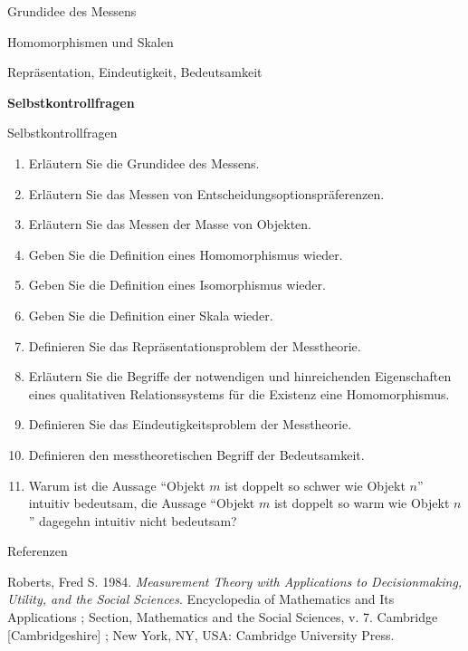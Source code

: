 \documentclass[
  8pt,
  ignorenonframetext,
]{beamer}
\providecommand{\tightlist}{%
  \setlength{\itemsep}{0pt}\setlength{\parskip}{0pt}}
\newlength{\cslhangindent}
\newlength{\cslentryspacingunit} %
\newenvironment{CSLReferences}[2] %
 {%
  \setlength{\parindent}{0pt}
  \ifodd #1
  \let\oldpar\par
  \def\par{\hangindent=\cslhangindent\oldpar}
  \fi
  \setlength{\parskip}{#2\cslentryspacingunit}
 }%
 {}
\begin{document}
\begin{frame}{}
\protect\hypertarget{section-7}{}
\vfill
\Large
{}

Grundidee des Messens

Homomorphismen und Skalen

Repräsentation, Eindeutigkeit, Bedeutsamkeit

\textbf{Selbstkontrollfragen} \vfill
\end{frame}

\begin{frame}{Selbstkontrollfragen}
\protect\hypertarget{selbstkontrollfragen}{}
\footnotesize
{}

\begin{enumerate}
\tightlist
\item
  Erläutern Sie die Grundidee des Messens.
\item
  Erläutern Sie das Messen von Entscheidungsoptionspräferenzen.
\item
  Erläutern Sie das Messen der Masse von Objekten.
\item
  Geben Sie die Definition eines Homomorphismus wieder.
\item
  Geben Sie die Definition eines Isomorphismus wieder.
\item
  Geben Sie die Definition einer Skala wieder.
\item
  Definieren Sie das Repräsentationsproblem der Messtheorie.
\item
  Erläutern Sie die Begriffe der notwendigen und hinreichenden
  Eigenschaften eines qualitativen Relationssystems für die Existenz
  eine Homomorphismus.
\item
  Definieren Sie das Eindeutigkeitsproblem der Messtheorie.
\item
  Definieren den messtheoretischen Begriff der Bedeutsamkeit.
\item
  Warum ist die Aussage ``Objekt \(m\) ist doppelt so schwer wie Objekt
  \(n\)'' intuitiv bedeutsam, die Aussage ``Objekt \(m\) ist doppelt so
  warm wie Objekt \(n\)'' dagegehn intuitiv nicht bedeutsam?
\end{enumerate}
\end{frame}

\begin{frame}{Referenzen}
\protect\hypertarget{referenzen}{}
\footnotesize

\hypertarget{refs}{}
\begin{CSLReferences}{1}{0}
\leavevmode{}%
Roberts, Fred S. 1984. \emph{Measurement Theory with Applications to
Decisionmaking, Utility, and the Social Sciences}. Encyclopedia of
Mathematics and Its Applications ; {Section}, {Mathematics} and the
Social Sciences, v. 7. Cambridge {[}Cambridgeshire{]} ; New York, NY,
USA: Cambridge University Press.

\end{CSLReferences}
\end{frame}
\end{document}
